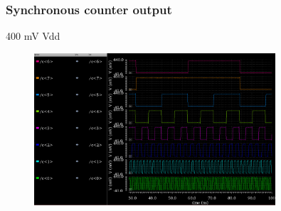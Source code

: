 \documentclass[t, screen, aspectratio=43]{beamer}
\begin{document}
\begin{frame}
	\frametitle{Synchronous counter output}
	\begin{block}{400 mV Vdd}
	\tiny

	\begin{figure}[htb!]

	        \center\includegraphics[width=0.8\textwidth, angle=0]{count_out.png}
	\end{figure}
	\end{block}	
\end{frame}
\end{document}
